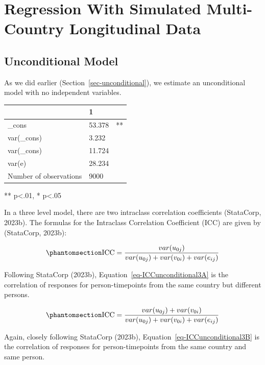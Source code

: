 \documentclass[
  letterpaper,
  DIV=11,
  numbers=noendperiod]{scrreprt}
\begin{document}
\section{Regression With Simulated Multi-Country Longitudinal
Data}\label{sec-regressionlongitudinal}

\subsection{Unconditional Model}\label{unconditional-model}

As we did earlier (Section~\ref{sec-unconditional}), we estimate an
unconditional model with no independent variables.

\begin{longtable}[]{@{}lll@{}}
\toprule\noalign{}
& 1 & \\
\midrule\noalign{}
\endhead
\bottomrule\noalign{}
\endlastfoot
\_cons & 53.378 & ** \\
var(\_cons) & 3.232 & \\
var(\_cons) & 11.724 & \\
var(e) & 28.234 & \\
Number of observations & 9000 & \\
\end{longtable}

** p\textless.01, * p\textless.05

In a three level model, there are two intraclass correlation
coefficients (StataCorp, 2023b).  The formulas for the
Intraclass Correlation Coefficient (ICC) are given by (StataCorp,
2023b):

\begin{equation}\phantomsection\label{eq-ICCunconditional3A}{\text{ICC} = \frac{var(u_{0j})}{var(u_{0j}) + var(v_{0i}) + var(e_{ij})}}\end{equation}

Following StataCorp (2023b), Equation~\ref{eq-ICCunconditional3A} is the
correlation of responses for person-timepoints from the same country but
different persons.

\begin{equation}\phantomsection\label{eq-ICCunconditional3B}{\text{ICC} = \frac{var(u_{0j}) + var(v_{0i})}{var(u_{0j}) + var(v_{0i}) + var(e_{ij})}}\end{equation}

Again, closely following StataCorp (2023b),
Equation~\ref{eq-ICCunconditional3B} is the correlation of responses for
person-timepoints from the same country and same person.
\end{document}
